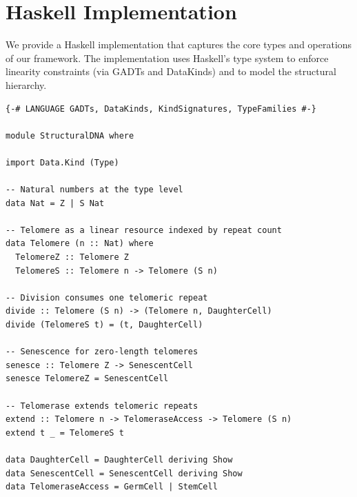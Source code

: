 \documentclass[12pt,a4paper]{article}
\theoremstyle{plain}
\theoremstyle{definition}
\begin{document}
\section{Haskell Implementation}\label{sec:haskell}

We provide a Haskell implementation that captures the core types and operations of our framework. The implementation uses Haskell's type system to enforce linearity constraints (via GADTs and DataKinds) and to model the structural hierarchy.

\begin{lstlisting}[language=DNALang, caption={Core types for the structural DNA memory architecture}]
{-# LANGUAGE GADTs, DataKinds, KindSignatures, TypeFamilies #-}

module StructuralDNA where

import Data.Kind (Type)

-- Natural numbers at the type level
data Nat = Z | S Nat

-- Telomere as a linear resource indexed by repeat count
data Telomere (n :: Nat) where
  TelomereZ :: Telomere Z
  TelomereS :: Telomere n -> Telomere (S n)

-- Division consumes one telomeric repeat
divide :: Telomere (S n) -> (Telomere n, DaughterCell)
divide (TelomereS t) = (t, DaughterCell)

-- Senescence for zero-length telomeres
senesce :: Telomere Z -> SenescentCell
senesce TelomereZ = SenescentCell

-- Telomerase extends telomeric repeats
extend :: Telomere n -> TelomeraseAccess -> Telomere (S n)
extend t _ = TelomereS t

data DaughterCell = DaughterCell deriving Show
data SenescentCell = SenescentCell deriving Show
data TelomeraseAccess = GermCell | StemCell
\end{lstlisting}
\end{document}

